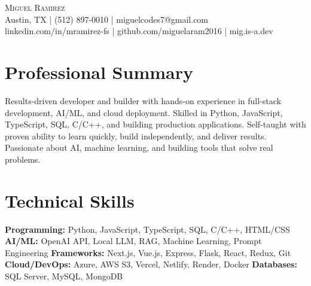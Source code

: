 \documentclass[letterpaper,10pt]{article}
\begin{document}
\begin{center}
  {\Large \scshape Miguel Ramirez} \\ \vspace{0pt}
  Austin, TX | (512) 897-0010 | miguelcodes7@gmail.com \\ 
  linkedin.com/in/mramirez-fs | github.com/miguelaram2016 | mig.is-a.dev
\end{center}

\section*{Professional Summary}
Results-driven developer and builder with hands-on experience in full-stack development, AI/ML, and cloud deployment. Skilled in Python, JavaScript, TypeScript, SQL, C/C++, and building production applications. Self-taught with proven ability to learn quickly, build independently, and deliver results. Passionate about AI, machine learning, and building tools that solve real problems.

\section*{Technical Skills}
\textbf{Programming:} Python, JavaScript, TypeScript, SQL, C/C++, HTML/CSS \newline
\textbf{AI/ML:} OpenAI API, Local LLM, RAG, Machine Learning, Prompt Engineering \newline
\textbf{Frameworks:} Next.js, Vue.js, Express, Flask, React, Redux, Git \newline
\textbf{Cloud/DevOps:} Azure, AWS S3, Vercel, Netlify, Render, Docker \newline
\textbf{Databases:} SQL Server, MySQL, MongoDB

\end{document}
